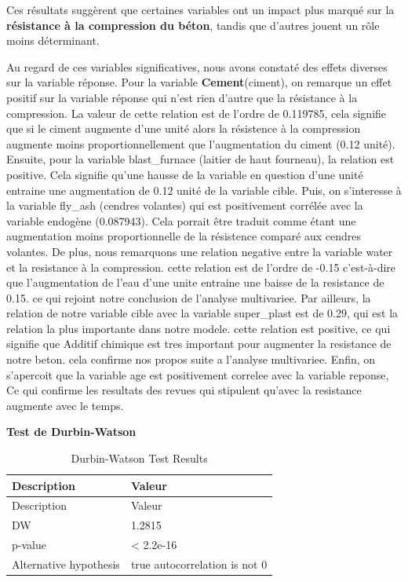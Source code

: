 \documentclass[
  12pt,
]{article}
\begin{document}
Ces résultats suggèrent que certaines variables ont un impact plus
marqué sur la \textbf{résistance à la compression du béton}, tandis que
d'autres jouent un rôle moins déterminant.

Au regard de ces variables significatives, nous avons constaté des
effets diverses sur la variable réponse. Pour la variable
\textbf{Cement}(ciment), on remarque un effet positif sur la variable
réponse qui n'est rien d'autre que la résistance à la compression. La
valeur de cette relation est de l'ordre de 0.119785, cela signifie que
si le ciment augmente d'une unité alors la résistence à la compression
augmente moins proportionnellement que l'augmentation du ciment (0.12
unité). Ensuite, pour la variable blast\_furnace (laitier de haut
fourneau), la relation est positive. Cela signifie qu'une hausse de la
variable en question d'une unité entraine une augmentation de 0.12 unité
de la variable cible. Puis, on s'interesse à la variable fly\_ash
(cendres volantes) qui est positivement corrélée avec la variable
endogène (0.087943). Cela porrait être traduit comme étant une
augmentation moins proportionnelle de la résistence comparé aux cendres
volantes. De plus, nous remarquons une relation negative entre la
variable water et la resistance à la compression. cette relation est de
l'ordre de -0.15 c'est-à-dire que l'augmentation de l'eau d'une unite
entraine une baisse de la resistance de 0.15. ce qui rejoint notre
conclusion de l'analyse multivariee. Par ailleurs, la relation de notre
variable cible avec la variable super\_plast est de 0.29, qui est la
relation la plus importante dans notre modele. cette relation est
positive, ce qui signifie que Additif chimique est tres important pour
augmenter la resistance de notre beton. cela confirme nos propos suite a
l'analyse multivariee. Enfin, on s'apercoit que la variable age est
positivement correlee avec la variable reponse, Ce qui confirme les
resultats des revues qui stipulent qu'avec la resistance augmente avec
le temps.

\textbf{Test de Durbin-Watson}

\begin{longtable}[]{@{}ll@{}}
\caption{Durbin-Watson Test Results}\tabularnewline
\toprule\noalign{}
Description & Valeur \\
\midrule\noalign{}
\endfirsthead
\toprule\noalign{}
Description & Valeur \\
\midrule\noalign{}
\endhead
\bottomrule\noalign{}
\endlastfoot
DW & 1.2815 \\
p-value & \textless{} 2.2e-16 \\
Alternative hypothesis & true autocorrelation is not 0 \\
\end{longtable}
\end{document}
